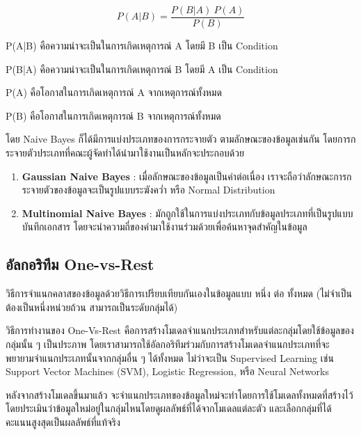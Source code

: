 \[P(A|B)=\frac{P(B|A)\ P(A)}{P(B)}\]

\par P(A|B) คือความน่าจะเป็นในการเกิดเหตุการณ์ A โดยมี B เป็น Condition
\par P(B|A) คือความน่าจะเป็นในการเกิดเหตุการณ์ B โดยมี A เป็น Condition
\par P(A) คือโอกาสในการเกิดเหตุการณ์ A จากเหตุการณ์ทั้งหมด
\par P(B) คือโอกาสในการเกิดเหตุการณ์ B จากเหตุการณ์ทั้งหมด

\par โดย Naive Bayes ก็ได้มีการแบ่งประเภทของการกระจายตัว ตามลักษณะของข้อมูลเช่นกัน โดยการกระจายตัวประเภทที่คณะผู้จัดทำได้นำมาใช้งานเป็นหลักจะประกอบด้วย
\begin{enumerate}
      \item \textbf{Gaussian Naive Bayes} : เมื่อลักษณะของข้อมูลเป็นค่าต่อเนื่อง เราจะถือว่าลักษณะการกระจายตัวของข้อมูลจะเป็นรูปแบบระฆังคว่ำ หรือ Normal Distribution
      \item \textbf{Multinomial Naive Bayes} : มักถูกใช้ในการแบ่งประเภทกับข้อมูลประเภทที่เป็นรูปแบบบันทึกเอกสาร โดยจะนำความถี่ของคำมาใช้งานร่วมด้วยเพื่อค้นหาจุดสำคัญในข้อมูล
\end{enumerate}

\subsection{อัลกอริทึม One-vs-Rest}
วิธีการจำแนกคลาสของข้อมูลด้วยวิธีการเปรียบเทียบกันเองในข้อมูลแบบ หนึ่ง ต่อ ทั้งหมด (ไม่จำเป็นต้องเป็นหนึ่งหน่วยถ้วน สามารถเป็นระดับกลุ่มได้)
\par วิธีการทำงานของ One-Vs-Rest คือการสร้างโมเดลจำแนกประเภทสำหรับแต่ละกลุ่มโดยใช้ข้อมูลของกลุ่มนั้น ๆ เป็นประภาพ โดยเราสามารถใช้อัลกอริทึมร่วมกับการสร้างโมเดลจำแนกประเภทที่จะพยายามจำแนกประเภทนั้นจากกลุ่มอื่น ๆ ได้ทั้งหมด ไม่ว่าจะเป็น Supervised Learning เช่น Support Vector Machines (SVM), Logistic Regression, หรือ Neural Networks
\par หลังจากสร้างโมเดลขึ้นมาแล้ว จะจำแนกประเภทของข้อมูลใหม่จะทำโดยการใช้โมเดลทั้งหมดที่สร้างไว้ โดยประเมินว่าข้อมูลใหม่อยู่ในกลุ่มไหนโดยดูผลลัพธ์ที่ได้จากโมเดลแต่ละตัว และเลือกกลุ่มที่ได้คะแนนสูงสุดเป็นผลลัพธ์ที่แท้จริง

